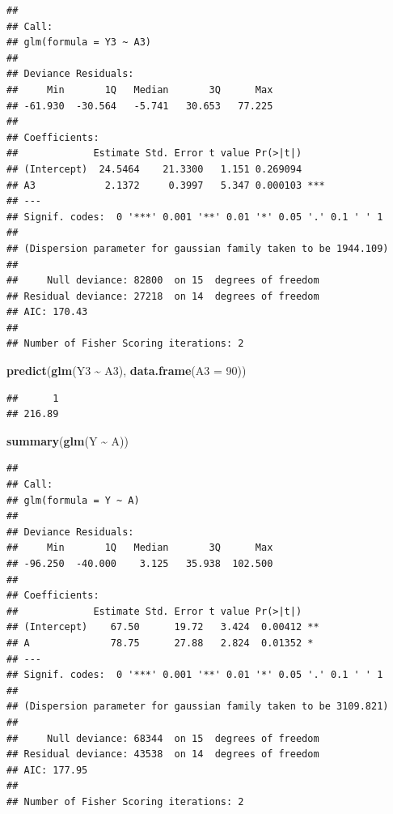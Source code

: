 \documentclass[
  10pt,
]{book}
\newenvironment{Shaded}{\begin{snugshade}}{\end{snugshade}}
\newcommand{\DataTypeTok}[1]{\textcolor[rgb]{0.13,0.29,0.53}{#1}}
\newcommand{\DecValTok}[1]{\textcolor[rgb]{0.00,0.00,0.81}{#1}}
\newcommand{\KeywordTok}[1]{\textcolor[rgb]{0.13,0.29,0.53}{\textbf{#1}}}
\newcommand{\NormalTok}[1]{#1}
\newcommand{\OperatorTok}[1]{\textcolor[rgb]{0.81,0.36,0.00}{\textbf{#1}}}
\newcommand{\StringTok}[1]{\textcolor[rgb]{0.31,0.60,0.02}{#1}}
\begin{document}
\begin{verbatim}
## 
## Call:
## glm(formula = Y3 ~ A3)
## 
## Deviance Residuals: 
##     Min       1Q   Median       3Q      Max  
## -61.930  -30.564   -5.741   30.653   77.225  
## 
## Coefficients:
##             Estimate Std. Error t value Pr(>|t|)    
## (Intercept)  24.5464    21.3300   1.151 0.269094    
## A3            2.1372     0.3997   5.347 0.000103 ***
## ---
## Signif. codes:  0 '***' 0.001 '**' 0.01 '*' 0.05 '.' 0.1 ' ' 1
## 
## (Dispersion parameter for gaussian family taken to be 1944.109)
## 
##     Null deviance: 82800  on 15  degrees of freedom
## Residual deviance: 27218  on 14  degrees of freedom
## AIC: 170.43
## 
## Number of Fisher Scoring iterations: 2
\end{verbatim}

\begin{Shaded}
\begin{Highlighting}[]
\KeywordTok{predict}\NormalTok{(}\KeywordTok{glm}\NormalTok{(Y3 }\OperatorTok{\textasciitilde{}}\StringTok{ }\NormalTok{A3), }\KeywordTok{data.frame}\NormalTok{(}\DataTypeTok{A3 =} \DecValTok{90}\NormalTok{))}
\end{Highlighting}
\end{Shaded}

\begin{verbatim}
##      1 
## 216.89
\end{verbatim}

\begin{Shaded}
\begin{Highlighting}[]
\KeywordTok{summary}\NormalTok{(}\KeywordTok{glm}\NormalTok{(Y }\OperatorTok{\textasciitilde{}}\StringTok{ }\NormalTok{A))}
\end{Highlighting}
\end{Shaded}

\begin{verbatim}
## 
## Call:
## glm(formula = Y ~ A)
## 
## Deviance Residuals: 
##     Min       1Q   Median       3Q      Max  
## -96.250  -40.000    3.125   35.938  102.500  
## 
## Coefficients:
##             Estimate Std. Error t value Pr(>|t|)   
## (Intercept)    67.50      19.72   3.424  0.00412 **
## A              78.75      27.88   2.824  0.01352 * 
## ---
## Signif. codes:  0 '***' 0.001 '**' 0.01 '*' 0.05 '.' 0.1 ' ' 1
## 
## (Dispersion parameter for gaussian family taken to be 3109.821)
## 
##     Null deviance: 68344  on 15  degrees of freedom
## Residual deviance: 43538  on 14  degrees of freedom
## AIC: 177.95
## 
## Number of Fisher Scoring iterations: 2
\end{verbatim}
\end{document}

